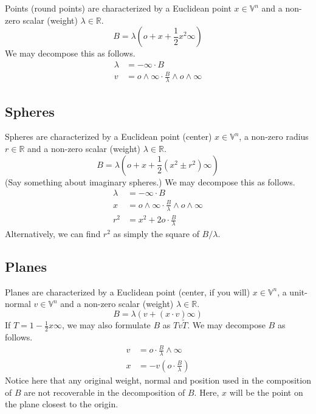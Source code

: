 \documentclass[12pt]{article}
\newcommand{\V}{\mathbb{V}}
\newcommand{\R}{\mathbb{R}}
\newcommand{\nvao}{o}
\newcommand{\nvai}{\infty}
\begin{document}
Points (round points) are characterized by a Euclidean point $x\in\V^n$ and
a non-zero scalar (weight) $\lambda\in\R$.
\begin{equation*}
B = \lambda\left(\nvao + x + \frac{1}{2}x^2\nvai\right)
\end{equation*}
We may decompose this as follows.
\begin{align*}
\lambda &= -\nvai\cdot B \\
v &= \nvao\wedge\nvai\cdot\frac{B}{\lambda}\wedge\nvao\wedge\nvai
\end{align*}

\subsection{Spheres}

Spheres are characterized by a Euclidean point (center) $x\in\V^n$, a
non-zero radius $r\in\R$ and a non-zero scalar (weight) $\lambda\in\R$.
\begin{equation*}
B = \lambda\left(\nvao + x + \frac{1}{2}(x^2\pm r^2)\nvai\right)
\end{equation*}
(Say something about imaginary spheres.)
We may decompose this as follows.
\begin{align*}
\lambda &= -\nvai\cdot B \\
x &= \nvao\wedge\nvai\cdot\frac{B}{\lambda}\wedge\nvao\wedge\nvai \\
r^2 &= x^2 + 2\nvao\cdot\frac{B}{\lambda}
\end{align*}
Alternatively, we can find $r^2$ as simply the square of $B/\lambda$.

\subsection{Planes}

Planes are characterized by a Euclidean point (center, if you will) $x\in\V^n$,
a unit-normal $v\in\V^n$ and a non-zero scalar (weight) $\lambda\in\R$.
\begin{equation*}
B = \lambda(v + (x\cdot v)\nvai)
\end{equation*}
If $T=1-\frac{1}{2}x\nvai$, we may also formulate $B$ as $Tv\tilde{T}$.
We may decompose $B$ as follows.
\begin{align*}
v &= \nvao\cdot\frac{B}{\lambda}\wedge\nvai \\
x &= -v\left(\nvao\cdot\frac{B}{\lambda}\right)
\end{align*}
Notice here that any original weight, normal and position used in
the composition of $B$ are not recoverable in the decomposition of $B$.
Here, $x$ will be the point on the plane closest to the origin.
\end{document}
